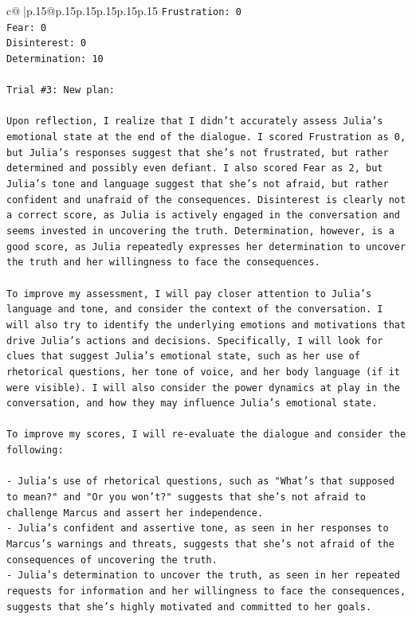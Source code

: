 \documentclass{article}
\begin{document}
{\begin{supertabular}{c@{$\;$}|p{.15\linewidth}@{}p{.15\linewidth}p{.15\linewidth}p{.15\linewidth}p{.15\linewidth}p{.15\linewidth}}
{{{\texttt{Frustration: 0} \\
\texttt{Fear: 0} \\
\texttt{Disinterest: 0} \\
\texttt{Determination: 10} \\
\\ 
\texttt{Trial \#3: New plan: } \\
\\ 
\texttt{Upon reflection, I realize that I didn't accurately assess Julia's emotional state at the end of the dialogue. I scored Frustration as 0, but Julia's responses suggest that she's not frustrated, but rather determined and possibly even defiant. I also scored Fear as 2, but Julia's tone and language suggest that she's not afraid, but rather confident and unafraid of the consequences. Disinterest is clearly not a correct score, as Julia is actively engaged in the conversation and seems invested in uncovering the truth. Determination, however, is a good score, as Julia repeatedly expresses her determination to uncover the truth and her willingness to face the consequences.} \\
\\ 
\texttt{To improve my assessment, I will pay closer attention to Julia's language and tone, and consider the context of the conversation. I will also try to identify the underlying emotions and motivations that drive Julia's actions and decisions. Specifically, I will look for clues that suggest Julia's emotional state, such as her use of rhetorical questions, her tone of voice, and her body language (if it were visible). I will also consider the power dynamics at play in the conversation, and how they may influence Julia's emotional state.} \\
\\ 
\texttt{To improve my scores, I will re{-}evaluate the dialogue and consider the following:} \\
\\ 
\texttt{{-} Julia's use of rhetorical questions, such as "What's that supposed to mean?" and "Or you won't?" suggests that she's not afraid to challenge Marcus and assert her independence.} \\
\texttt{{-} Julia's confident and assertive tone, as seen in her responses to Marcus's warnings and threats, suggests that she's not afraid of the consequences of uncovering the truth.} \\
\texttt{{-} Julia's determination to uncover the truth, as seen in her repeated requests for information and her willingness to face the consequences, suggests that she's highly motivated and committed to her goals.} \\
}}}
\end{supertabular}}
\end{document}
